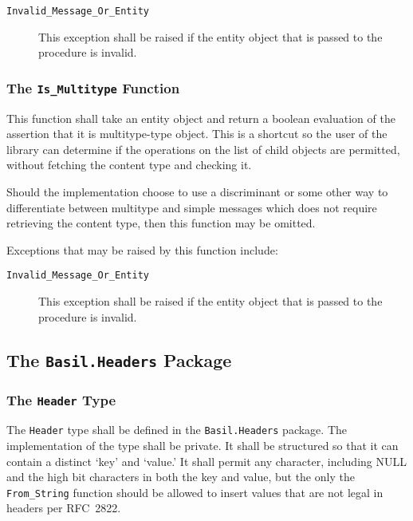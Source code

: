 \documentclass[11pt]{article}
\begin{document}
\begin{description}

\item[\texttt{Invalid\_Message\_Or\_Entity}] This exception shall be
  raised if the entity object that is passed to the procedure is
  invalid.

\end{description}

\subsubsection{The \texttt{Is\_Multitype} Function}

This function shall take an entity object and return a boolean
evaluation of the assertion that it is multitype-type object. This is
a shortcut so the user of the library can determine if the operations
on the list of child objects are permitted, without fetching the
content type and checking it.

Should the implementation choose to use a discriminant or some other
way to differentiate between multitype and simple messages which does
not require retrieving the content type, then this function may be
omitted. 

Exceptions that may be raised by this function include:

\begin{description}

\item[\texttt{Invalid\_Message\_Or\_Entity}] This exception shall be
  raised if the entity object that is passed to the procedure is
  invalid.

\end{description}



\subsection{The \texttt{Basil.Headers} Package}

\subsubsection{The \texttt{Header} Type}

The \texttt{Header} type shall be defined in the
\texttt{Basil.Headers} package. The implementation of the type shall
be private. It shall be structured so that it can contain a distinct
`key' and `value.' It shall permit any character, including NULL and
the high bit characters in both the key and value, but the only the
\texttt{From\_String} function should be allowed to insert values that
are not legal in headers per RFC~2822.
\end{document}
